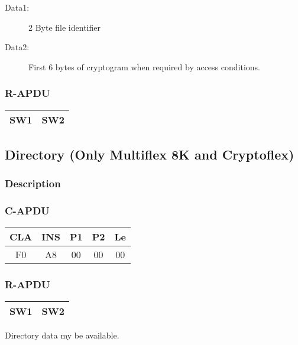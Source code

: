 \documentclass[a4paper,oneside]{article}
\begin{document}
\begin{description}
\item[Data1:] 2 Byte file identifier
\item[Data2:] First 6 bytes of cryptogram when required by access conditions.
\end{description}

\subsubsection*{R-APDU}

\begin{tabular}{|c|c|} \hline
SW1 & SW2 \\ \hline
\end{tabular}


\subsection{Directory (Only Multiflex 8K and Cryptoflex)}

\subsubsection*{Description}

\subsubsection*{C-APDU}

\begin{tabular}{|c|c|c|c|c|} \hline
CLA & INS & P1 & P2 & Le \\ \hline \hline
F0 & A8 & 00 & 00 & 00 \\ \hline
\end{tabular}

\subsubsection*{R-APDU}

\begin{tabular}{|c|c|} \hline
SW1 & SW2 \\ \hline
\end{tabular}

Directory data my be available.
\end{document}
